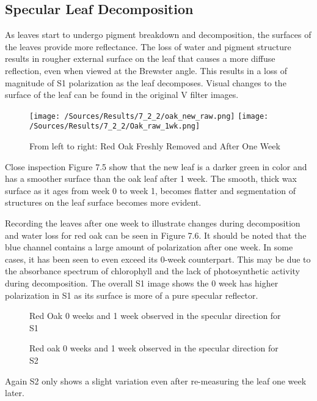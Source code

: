 \subsection{Specular Leaf Decomposition}
As leaves start to undergo pigment breakdown and decomposition, the surfaces of the leaves provide more reflectance.  The loss of water and pigment structure results in rougher external surface on the leaf that causes a more diffuse reflection, even when viewed at the Brewster angle.  This results in a loss of magnitude of S1 polarization as the leaf decomposes.  Visual changes to the surface of the leaf can be found in the original V filter images.
%
\begin{figure}[htp]
    \centering
    \hspace*{\fill}%
    \texttt{[image: /Sources/Results/7\_2\_2/oak\_new\_raw.png]}\hfill%
    \texttt{[image: /Sources/Results/7\_2\_2/Oak\_raw\_1wk.png]}
    \hspace*{\fill}%
    \caption{From left to right: Red Oak Freshly Removed and After One Week}
    \label{fig:specular-raw-decompose}
\end{figure}
%
Close inspection Figure 7.5 show that the new leaf is a darker green in color and has a smoother surface than the oak leaf after 1 week.  The smooth, thick wax surface as it ages from week 0 to week 1, becomes flatter and segmentation of structures on the leaf surface becomes more evident.

Recording the leaves after one week to illustrate changes during decomposition and water loss for red oak can be seen in Figure 7.6.  It should be noted that the blue channel contains a large amount of polarization after one week. In some cases, it has been seen to even exceed its 0-week counterpart. This may be due to the absorbance spectrum of chlorophyll and the lack of photosynthetic activity during decomposition. The overall S1 image shows the 0 week has higher polarization in S1 as its surface is more of a pure specular reflector.
%
\begin{figure}[!htb]
    \begin{center}
    \end{center}
    \caption{Red Oak 0 weeks and 1 week observed in the specular direction for S1}
    \label{fig:polarization}
\end{figure}
%
\begin{figure}[!htb]
    \begin{center}
    \end{center}
    \caption{Red oak 0 weeks and 1 week observed in the specular direction for S2}
    \label{fig:polarization}
\end{figure}
%
Again S2 only shows a slight variation even after re-measuring the leaf one week later.

